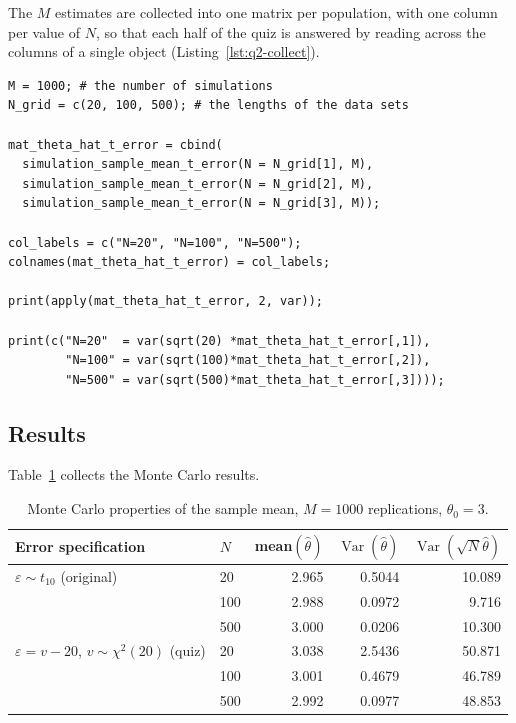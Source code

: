 \documentclass[11pt]{article}
\newcommand{\code}[1]{\texttt{#1}}
\begin{document}
The $M$ estimates are collected into one matrix per population, with one column
per value of $N$, so that each half of the quiz is answered by reading across
the columns of a single object (Listing~\ref{lst:q2-collect}).

\begin{lstlisting}[style=Rcode,caption={Collecting the results, one matrix per
error distribution (excerpt from
\code{R/q2\_monte\_carlo.R}).},label={lst:q2-collect}]
M = 1000; # the number of simulations
N_grid = c(20, 100, 500); # the lengths of the data sets

mat_theta_hat_t_error = cbind(
  simulation_sample_mean_t_error(N = N_grid[1], M),
  simulation_sample_mean_t_error(N = N_grid[2], M),
  simulation_sample_mean_t_error(N = N_grid[3], M));

col_labels = c("N=20", "N=100", "N=500");
colnames(mat_theta_hat_t_error) = col_labels;

print(apply(mat_theta_hat_t_error, 2, var));

print(c("N=20"  = var(sqrt(20) *mat_theta_hat_t_error[,1]),
        "N=100" = var(sqrt(100)*mat_theta_hat_t_error[,2]),
        "N=500" = var(sqrt(500)*mat_theta_hat_t_error[,3])));
\end{lstlisting}

\subsection{Results}

Table~\ref{tab:q2} collects the Monte Carlo results.

\begin{table}[htbp]
\centering
\caption{Monte Carlo properties of the sample mean, $M = 1000$ replications,
$\theta_0 = 3$.}
\label{tab:q2}
\small
\begin{tabular}{llrrr}
\toprule
Error specification & $N$ & mean$(\hat\theta)$ &
$\operatorname{Var}(\hat\theta)$ &
$\operatorname{Var}(\sqrt{N}\hat\theta)$ \\
\midrule
$\varepsilon \sim t_{10}$ (original)
  & 20  & 2.965 & 0.5044 & 10.089 \\
  & 100 & 2.988 & 0.0972 &  9.716 \\
  & 500 & 3.000 & 0.0206 & 10.300 \\
\addlinespace
$\varepsilon = v - 20$, $v \sim \chi^2(20)$ (quiz)
  & 20  & 3.038 & 2.5436 & 50.871 \\
  & 100 & 3.001 & 0.4679 & 46.789 \\
  & 500 & 2.992 & 0.0977 & 48.853 \\
\bottomrule
\end{tabular}
\end{table}
\end{document}
